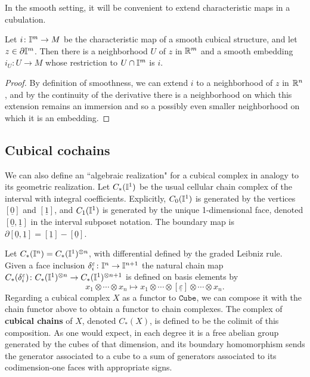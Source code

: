 In the smooth setting, it will be convenient to extend characteristic maps in a cubulation.

\begin{lemma}\label{L:charextension}
	Let $i \colon \mathbb{I}^m \to M$ be the characteristic map of a smooth cubical structure, and let $z \in \partial \mathbb{I}^m$.
	Then there is a neighborhood $U$ of $z$ in $\mathbb{R}^m$ and a smooth embedding $i_U: U \to M$ whose restriction to $U \cap \mathbb{I}^m$ is $i$.
\end{lemma}

\begin{proof}
	By definition of smoothness, we can extend $i$ to a neighborhood of $z$ in $\mathbb{R}^n$, and by the continuity of the derivative there is a neighborhood on which this extension remains an immersion and so a possibly even smaller neighborhood on which it is an embedding.
\end{proof}

\subsection{Cubical cochains}

We can also define an ``algebraic realization" for a cubical complex in analogy to its geometric realization.
Let $C_{\ast}(\mathbb{I}^1)$ be the usual cellular chain complex of the interval with integral coefficients.
Explicitly, $C_{0}(\mathbb{I}^1)$ is generated by the vertices $[\underline{0}]$ and $[\underline{1}]$, and $C_{1}(\mathbb{I}^1)$ is generated by the unique 1-dimensional face, denoted $[\underline{0},\underline{1}]$ in the interval subposet notation.
The boundary map is $\partial [\underline{0},\underline{1}]=[\underline{1}]-[\underline{0}]$.

Let $C_{\ast}(\mathbb{I}^n) = C_{\ast}(\mathbb{I}^1)^{\otimes n}$, with differential defined by the graded Leibniz rule.
Given a face inclusion $\delta_i^{\varepsilon} \colon \mathbb{I}^n \to \mathbb{I}^{n+1}$ the natural chain map $C_{\ast}(\delta_i^{\varepsilon}) \colon C_{\ast}(\mathbb{I}^1)^{\otimes n} \to C_{\ast}(\mathbb{I}^1)^{\otimes n+1}$ is defined on basis elements by
\[
x_1 \otimes \cdots \otimes x_n \mapsto
x_1 \otimes \cdots \otimes [\underline{\varepsilon}] \otimes \cdots \otimes x_n.
\]
Regarding a cubical complex $X$ as a functor to $\mathtt{Cube}$, we can compose it with the chain functor above to obtain a functor to chain complexes.
The complex of \textbf{cubical chains} of $X$, denoted $C_*(X)$, is defined to be the colimit of this composition.
As one would expect, in each degree it is a free abelian group generated by the cubes of that dimension, and its boundary homomorphism sends the
generator associated to a cube to a sum of generators associated to its codimension-one faces with appropriate signs.


